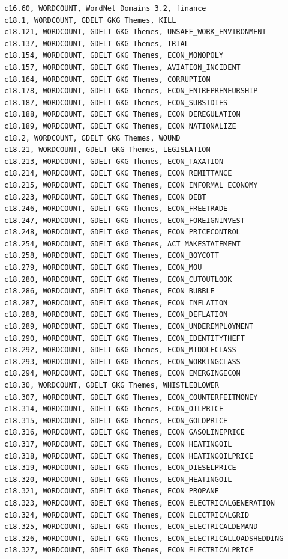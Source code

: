 \documentclass[12pt]{article}
\begin{document}
\footnotesize
\begin{verbatim}
c16.60, WORDCOUNT, WordNet Domains 3.2, finance
c18.1, WORDCOUNT, GDELT GKG Themes, KILL
c18.121, WORDCOUNT, GDELT GKG Themes, UNSAFE_WORK_ENVIRONMENT
c18.137, WORDCOUNT, GDELT GKG Themes, TRIAL
c18.154, WORDCOUNT, GDELT GKG Themes, ECON_MONOPOLY
c18.157, WORDCOUNT, GDELT GKG Themes, AVIATION_INCIDENT
c18.164, WORDCOUNT, GDELT GKG Themes, CORRUPTION
c18.178, WORDCOUNT, GDELT GKG Themes, ECON_ENTREPRENEURSHIP
c18.187, WORDCOUNT, GDELT GKG Themes, ECON_SUBSIDIES
c18.188, WORDCOUNT, GDELT GKG Themes, ECON_DEREGULATION
c18.189, WORDCOUNT, GDELT GKG Themes, ECON_NATIONALIZE
c18.2, WORDCOUNT, GDELT GKG Themes, WOUND
c18.21, WORDCOUNT, GDELT GKG Themes, LEGISLATION
c18.213, WORDCOUNT, GDELT GKG Themes, ECON_TAXATION
c18.214, WORDCOUNT, GDELT GKG Themes, ECON_REMITTANCE
c18.215, WORDCOUNT, GDELT GKG Themes, ECON_INFORMAL_ECONOMY
c18.223, WORDCOUNT, GDELT GKG Themes, ECON_DEBT
c18.246, WORDCOUNT, GDELT GKG Themes, ECON_FREETRADE
c18.247, WORDCOUNT, GDELT GKG Themes, ECON_FOREIGNINVEST
c18.248, WORDCOUNT, GDELT GKG Themes, ECON_PRICECONTROL
c18.254, WORDCOUNT, GDELT GKG Themes, ACT_MAKESTATEMENT
c18.258, WORDCOUNT, GDELT GKG Themes, ECON_BOYCOTT
c18.279, WORDCOUNT, GDELT GKG Themes, ECON_MOU
c18.280, WORDCOUNT, GDELT GKG Themes, ECON_CUTOUTLOOK
c18.286, WORDCOUNT, GDELT GKG Themes, ECON_BUBBLE
c18.287, WORDCOUNT, GDELT GKG Themes, ECON_INFLATION
c18.288, WORDCOUNT, GDELT GKG Themes, ECON_DEFLATION
c18.289, WORDCOUNT, GDELT GKG Themes, ECON_UNDEREMPLOYMENT
c18.290, WORDCOUNT, GDELT GKG Themes, ECON_IDENTITYTHEFT
c18.292, WORDCOUNT, GDELT GKG Themes, ECON_MIDDLECLASS
c18.293, WORDCOUNT, GDELT GKG Themes, ECON_WORKINGCLASS
c18.294, WORDCOUNT, GDELT GKG Themes, ECON_EMERGINGECON
c18.30, WORDCOUNT, GDELT GKG Themes, WHISTLEBLOWER
c18.307, WORDCOUNT, GDELT GKG Themes, ECON_COUNTERFEITMONEY
c18.314, WORDCOUNT, GDELT GKG Themes, ECON_OILPRICE
c18.315, WORDCOUNT, GDELT GKG Themes, ECON_GOLDPRICE
c18.316, WORDCOUNT, GDELT GKG Themes, ECON_GASOLINEPRICE
c18.317, WORDCOUNT, GDELT GKG Themes, ECON_HEATINGOIL
c18.318, WORDCOUNT, GDELT GKG Themes, ECON_HEATINGOILPRICE
c18.319, WORDCOUNT, GDELT GKG Themes, ECON_DIESELPRICE
c18.320, WORDCOUNT, GDELT GKG Themes, ECON_HEATINGOIL
c18.321, WORDCOUNT, GDELT GKG Themes, ECON_PROPANE
c18.323, WORDCOUNT, GDELT GKG Themes, ECON_ELECTRICALGENERATION
c18.324, WORDCOUNT, GDELT GKG Themes, ECON_ELECTRICALGRID
c18.325, WORDCOUNT, GDELT GKG Themes, ECON_ELECTRICALDEMAND
c18.326, WORDCOUNT, GDELT GKG Themes, ECON_ELECTRICALLOADSHEDDING
c18.327, WORDCOUNT, GDELT GKG Themes, ECON_ELECTRICALPRICE

\end{verbatim}
\end{document}
